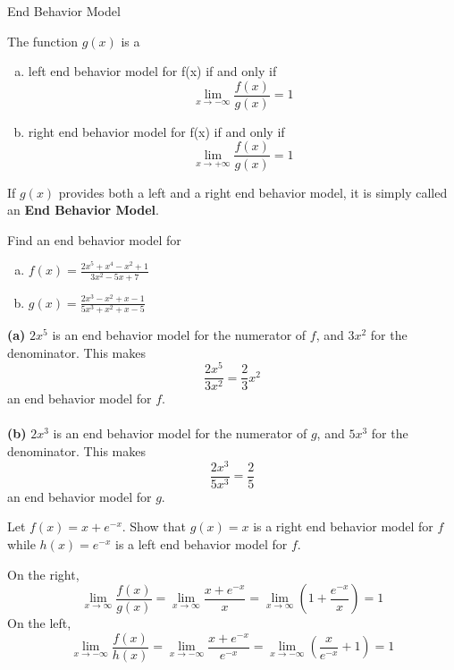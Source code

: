 \documentclass[12pt]{article}
\begin{document}
\begin{definition}{End Behavior Model}

    The function $g(x)$ is a
    \begin{enumerate}[(a)]
        \item left end behavior model for f(x) if and only if \[ \lim_{x \to -\infty} \frac{f(x)}{g(x)} = 1 \]
        \item right end behavior model for f(x) if and only if \[ \lim_{x \to +\infty} \frac{f(x)}{g(x)} = 1 \]
    \end{enumerate}
    If $g(x)$ provides both a left and a right end behavior model, it is simply called an \textbf{End Behavior Model}.
\end{definition}

\begin{example}{Find an end behavior model for
    \begin{enumerate}[(a)]
        \item $f(x) = \frac{2x^5+x^4-x^2+1}{3x^2-5x+7}$
        \item $g(x) = \frac{2x^3-x^2+x-1}{5x^3+x^2+x-5}$
    \end{enumerate}}
    
    \textbf{(a)} $2x^5$ is an end behavior model for the numerator of $f$, and $3x^2$ for the denominator. This makes \[
        \frac{2x^5}{3x^2} = \frac{2}{3}x^2
    \] an end behavior model for $f$. \\~\\
    \textbf{(b)} $2x^3$ is an end behavior model for the numerator of $g$, and $5x^3$ for the denominator. This makes \[
        \frac{2x^3}{5x^3} = \frac{2}{5}
    \] an end behavior model for $g$.
\end{example}

\begin{example}{Let $f(x)=x+e^{-x}$. Show that $g(x)=x$ is a right end behavior model for $f$ while $h(x)=e^{-x}$ is a left end behavior model for $f$.}
    
    On the right, \[
        \lim_{x \to \infty} \frac{f(x)}{g(x)} = \lim_{x \to \infty} \frac{x+e^{-x}}{x} = \lim_{x \to \infty} \left( 1+\frac{e^{-x}}{x} \right) = 1
    \] On the left, \[
        \lim_{x \to -\infty} \frac{f(x)}{h(x)} = \lim_{x \to -\infty} \frac{x+e^{-x}}{e^{-x}} = \lim_{x \to -\infty} \left( \frac{x}{e^{-x}}+1 \right) = 1
    \]
\end{example}


\end{document}
